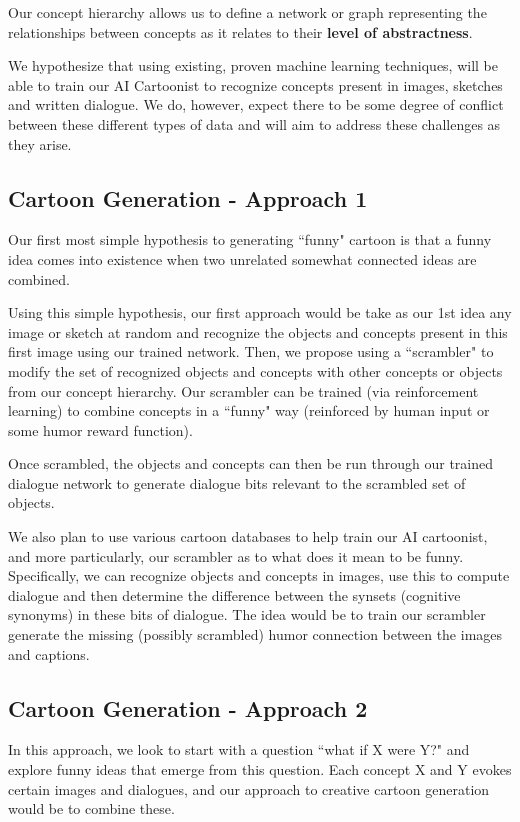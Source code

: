 \documentclass[letter]{article}
\begin{document}
Our concept hierarchy allows us to define a network or graph representing the relationships between concepts as it relates to their \textbf{level of abstractness}. 

We hypothesize that using existing, proven machine learning techniques, will be able to train our AI Cartoonist to recognize concepts present in images, sketches and written dialogue. We do, however, expect there to be some degree of conflict between these different types of data and will aim to address these challenges as they arise. 


\subsection{Cartoon Generation - Approach 1}

Our first most simple hypothesis to generating ``funny" cartoon is that a funny idea comes into existence when two unrelated somewhat connected ideas are combined. 

Using this simple hypothesis, our first approach would be take as our 1st idea any image or sketch at random and recognize the objects and concepts present in this first image using our trained network. Then, we propose using a ``scrambler" to modify the set of recognized objects and concepts with other concepts or objects from our concept hierarchy. Our scrambler can be trained (via reinforcement learning) to combine concepts in a ``funny" way (reinforced by human input or some humor reward function).

Once scrambled, the objects and concepts can then be run through our trained dialogue network to generate dialogue bits relevant to the scrambled set of objects. 

We also plan to use various cartoon databases to help train our AI cartoonist, and more particularly, our scrambler as to what does it mean to be funny. Specifically, we can recognize objects and concepts in images, use this to compute dialogue and then determine the difference between the synsets (cognitive synonyms) in these bits of dialogue. The idea would be to train our scrambler generate the missing (possibly scrambled) humor connection between the images and captions.

\subsection{Cartoon Generation - Approach 2}

In this approach, we look to start with a question ``what if X were Y?" and explore funny ideas that emerge from this question. Each concept X and Y evokes certain images and dialogues, and our approach to creative cartoon generation would be to combine these. 
\end{document}
